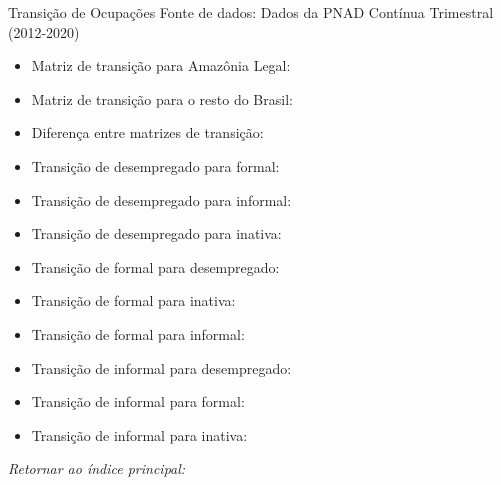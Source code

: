 \begin{frame}[label=_transicao_ocupacao]{Transição de Ocupações}
{\footnotesize Fonte de dados: Dados da PNAD Contínua Trimestral (2012-2020)}
\begin{itemize}

\item{Matriz de transição para Amazônia Legal: \hyperlink{_transicao_ocupacao_amazonia_legal_matriz}{}}

\item{Matriz de transição para o resto do Brasil: \hyperlink{_transicao_ocupacao_resto_brasil_matriz}{}}

\item{Diferença entre matrizes de transição: \hyperlink{_transicao_ocupacao_matriz_diferenca}{}}

\item{Transição de desempregado para formal: \hyperlink{_transicao_ocupacao_sh_desempregado_sh_formal}{}}
\item{Transição de desempregado para informal: \hyperlink{_transicao_ocupacao_sh_desempregado_sh_informal}{}}
\item{Transição de desempregado para inativa: \hyperlink{_transicao_ocupacao_sh_desempregado_sh_inativa}{}}
\item{Transição de formal para desempregado: \hyperlink{_transicao_ocupacao_sh_formal_sh_desempregado}{}}
\item{Transição de formal para inativa: \hyperlink{_transicao_ocupacao_sh_formal_sh_inativa}{}}
\item{Transição de formal para informal: \hyperlink{_transicao_ocupacao_sh_formal_sh_informal}{}}
\item{Transição de informal para desempregado: \hyperlink{_transicao_ocupacao_sh_informal_sh_desempregado}{}}
\item{Transição de informal para formal: \hyperlink{_transicao_ocupacao_sh_informal_sh_formal}{}}
\item{Transição de informal para inativa: \hyperlink{_transicao_ocupacao_sh_informal_sh_inativa}{}}

\end{itemize}

\begin{small}
\textit{Retornar ao índice principal: \hyperlink{indice_principal}{} }
\end{small}

\end{frame}

